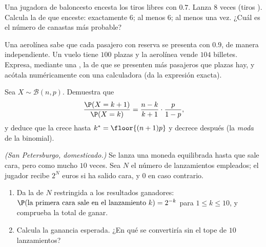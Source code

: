 \begin{exercise}[$\star\star$]\label{exo:g12:randvar:5}
Una jugadora de baloncesto encesta los tiros libres con 
$0.7$. Lanza $8$ veces (tiros ). Calcula la  de
que enceste: exactamente $6$; al menos $6$; al menos una vez. ¿Cuál es el
número de canastas más probable?
\end{exercise}

\begin{exercise}[$\star\star$]\label{exo:g12:randvar:6}
Una aerolínea sabe que cada pasajero con reserva se presenta con
 $0.9$, de manera independiente. Un vuelo tiene $100$ plazas y
la aerolínea vende $104$ billetes. Expresa, mediante una , la  de que se presenten más pasajeros que plazas hay,
y acótala numéricamente con una calculadora (da la expresión exacta).
\end{exercise}

\begin{exercise}[$\star\star$]\label{exo:g12:randvar:7}
Sea $X \sim \mathcal B(n, p)$. Demuestra que
\[
\frac{\P(X = k+1)}{\P(X = k)} = \frac{n-k}{k+1}\cdot\frac{p}{1-p},
\]
y deduce que la  crece hasta $k^* = \floor{(n+1)p}$ y decrece
después (la \emph{moda} de la binomial).
\end{exercise}

\begin{exercise}[$\star\star\star$]\label{exo:g12:randvar:8}
\emph{(San Petersburgo, domesticado.)} Se lanza una moneda equilibrada
hasta que sale cara, pero como mucho $10$ veces. Sea $N$ el número de
lanzamientos empleados; el jugador recibe $2^N$ euros si ha salido cara, y
$0$ en caso contrario.
\begin{enumerate}
  \item Da la  de $N$ restringida a los resultados ganadores:
        $\P(\text{la primera cara sale en el lanzamiento } k) = 2^{-k}$
        para $1 \leq k \leq 10$, y comprueba la  total de
        ganar.
  \item Calcula la ganancia esperada. ¿En qué se convertiría sin el tope de
        $10$ lanzamientos?
\end{enumerate}
\end{exercise}

